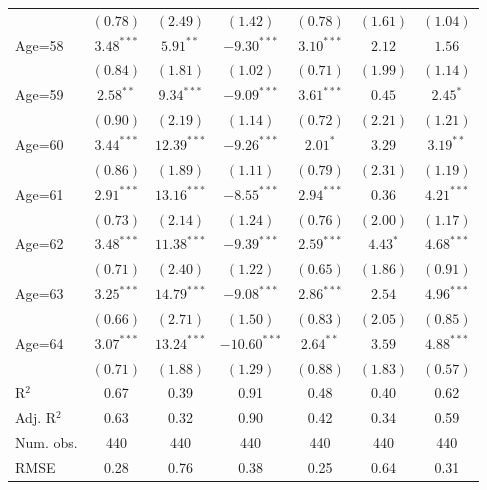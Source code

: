 \documentclass[fullpage]{paper}
\begin{document}
\begin{center}
\begin{longtable}{l c c c c c c }
            & $(0.78)$      & $(2.49)$      & $(1.42)$       & $(0.78)$      & $(1.61)$      & $(1.04)$      \\
Age=58      & $3.48^{***}$  & $5.91^{**}$   & $-9.30^{***}$  & $3.10^{***}$  & $2.12$        & $1.56$        \\
            & $(0.84)$      & $(1.81)$      & $(1.02)$       & $(0.71)$      & $(1.99)$      & $(1.14)$      \\
Age=59      & $2.58^{**}$   & $9.34^{***}$  & $-9.09^{***}$  & $3.61^{***}$  & $0.45$        & $2.45^{*}$    \\
            & $(0.90)$      & $(2.19)$      & $(1.14)$       & $(0.72)$      & $(2.21)$      & $(1.21)$      \\
Age=60      & $3.44^{***}$  & $12.39^{***}$ & $-9.26^{***}$  & $2.01^{*}$    & $3.29$        & $3.19^{**}$   \\
            & $(0.86)$      & $(1.89)$      & $(1.11)$       & $(0.79)$      & $(2.31)$      & $(1.19)$      \\
Age=61      & $2.91^{***}$  & $13.16^{***}$ & $-8.55^{***}$  & $2.94^{***}$  & $0.36$        & $4.21^{***}$  \\
            & $(0.73)$      & $(2.14)$      & $(1.24)$       & $(0.76)$      & $(2.00)$      & $(1.17)$      \\
Age=62      & $3.48^{***}$  & $11.38^{***}$ & $-9.39^{***}$  & $2.59^{***}$  & $4.43^{*}$    & $4.68^{***}$  \\
            & $(0.71)$      & $(2.40)$      & $(1.22)$       & $(0.65)$      & $(1.86)$      & $(0.91)$      \\
Age=63      & $3.25^{***}$  & $14.79^{***}$ & $-9.08^{***}$  & $2.86^{***}$  & $2.54$        & $4.96^{***}$  \\
            & $(0.66)$      & $(2.71)$      & $(1.50)$       & $(0.83)$      & $(2.05)$      & $(0.85)$      \\
Age=64      & $3.07^{***}$  & $13.24^{***}$ & $-10.60^{***}$ & $2.64^{**}$   & $3.59$        & $4.88^{***}$  \\
            & $(0.71)$      & $(1.88)$      & $(1.29)$       & $(0.88)$      & $(1.83)$      & $(0.57)$      \\
\hline
R$^2$       & 0.67          & 0.39          & 0.91           & 0.48          & 0.40          & 0.62          \\
Adj. R$^2$  & 0.63          & 0.32          & 0.90           & 0.42          & 0.34          & 0.59          \\
Num. obs.   & 440           & 440           & 440            & 440           & 440           & 440           \\
RMSE        & 0.28          & 0.76          & 0.38           & 0.25          & 0.64          & 0.31          \\
\end{longtable}
\end{center}
\end{document}
